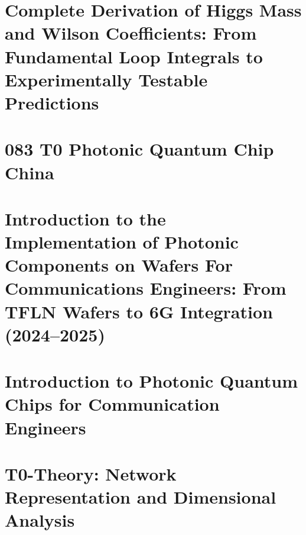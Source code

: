 	\chapter{Complete Derivation of Higgs Mass and Wilson Coefficients: From Fundamental Loop Integrals to Experimentally Testable Predictions}
	
	\chapter{083 T0 Photonic Quantum Chip China}
	
	\chapter{Introduction to the Implementation of Photonic Components on Wafers For Communications Engineers: From TFLN Wafers to 6G Integration (2024–2025)}
	
	\chapter{Introduction to Photonic Quantum Chips for Communication Engineers}
	
	\chapter{T0-Theory: Network Representation and Dimensional Analysis}
	


